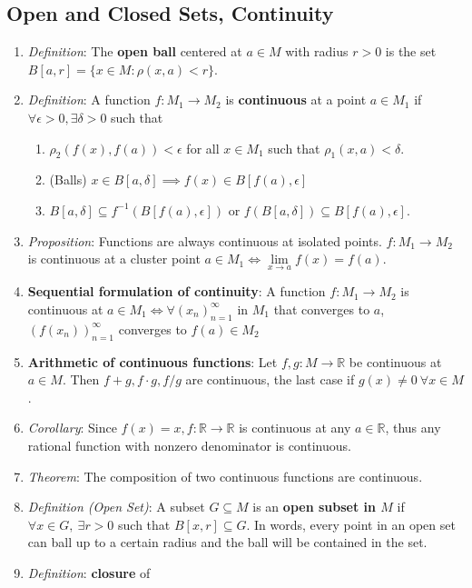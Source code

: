 \documentclass[10pt]{article}
\newcommand{\seqn}[1]{(#1)^\infty_{n=1}}
\newcommand{\real}{\mathbb{R}}
\begin{document}
\begin{multicols*}{3}
	\section{Open and Closed Sets, Continuity}
	\begin{enumerate}
		\item \emph{Definition}: The \textbf{open ball} centered at $a\in M$ with
			radius $r>0$ is the set $B[a,r]=\{x\in M:\rho(x,a)<r\}$.
		\item \emph{Definition}: A function $f:M_{1}\to M_{2}$ is
			\textbf{continuous} at a point $a\in M_{1}$ if
			$\forall\epsilon>0,\exists\delta>0$ such that
			\begin{enumerate}
				\item
					$\rho_{2}(f(x), f(a))<\epsilon$ for all $x\in M_{1}$ such that
					$\rho_{1}(x,a)<\delta$.
				\item (Balls) $x\in B[a,\delta]\implies f(x)\in B[f(a),\epsilon]$
				\item $B[a,\delta]\subseteq f^{-1}(B[f(a),\epsilon])$ or
				$f(B[a,\delta])\subseteq B[f(a),\epsilon]$.
			\end{enumerate}
		\item \emph{Proposition}: Functions are always continuous at isolated
			points. $f:M_{1}\to M_{2}$ is continuous at a cluster
			point $a\in M_{1}\iff\lim\limits_{x\to a}f(x) = f(a)$.
		\item \textbf{Sequential formulation of continuity}: A
			function $f:M_{1}\to M_{2}$ is continuous at
			$a\in M_{1}\iff\forall\seqn{x_{n}}$ in $M_{1}$ that converges to $a$,
			$\seqn{f(x_{n})}$ converges to $f(a)\in M_{2}$
			\item \textbf{Arithmetic of continuous functions}: Let $f,g:M\to\real$ be continuous at $a\in M$. Then
			$f+g, f\cdot g,f/g$ are continuous, the last case if
			$g(x)\neq0\ \forall x\in M$.
		\item \emph{Corollary}: Since $f(x)=x, f:\real\to\real$ is continuous at any
			$a\in\real$, thus any rational function with nonzero denominator is
			continuous.
		\item \emph{Theorem}: The composition of two continuous functions are continuous.
		\item \emph{Definition (Open Set)}: A subset $G\subseteq M$ is an \textbf{open subset
			in $M$} if $\forall x\in G,\ \exists r>0$ such that $B[x,r]\subseteq G$. In
			words, every point in an open set can ball up to a certain radius and the
			ball will be contained in the set.
		\item \emph{Definition}: \textbf{closure} of

\end{enumerate}
\end{multicols*}
\end{document}
